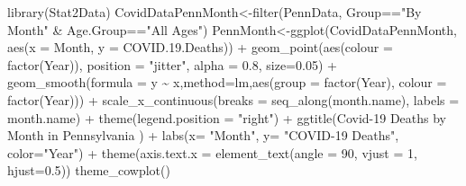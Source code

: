 \documentclass[
]{article}
\newenvironment{Shaded}{\begin{snugshade}}{\end{snugshade}}
\newcommand{\AttributeTok}[1]{\textcolor[rgb]{0.77,0.63,0.00}{#1}}
\newcommand{\DecValTok}[1]{\textcolor[rgb]{0.00,0.00,0.81}{#1}}
\newcommand{\FloatTok}[1]{\textcolor[rgb]{0.00,0.00,0.81}{#1}}
\newcommand{\FunctionTok}[1]{\textcolor[rgb]{0.00,0.00,0.00}{#1}}
\newcommand{\NormalTok}[1]{#1}
\newcommand{\OtherTok}[1]{\textcolor[rgb]{0.56,0.35,0.01}{#1}}
\newcommand{\SpecialCharTok}[1]{\textcolor[rgb]{0.00,0.00,0.00}{#1}}
\newcommand{\StringTok}[1]{\textcolor[rgb]{0.31,0.60,0.02}{#1}}
\begin{document}
\begin{Shaded}
\begin{Highlighting}[]
\FunctionTok{library}\NormalTok{(Stat2Data)}
\NormalTok{CovidDataPennMonth}\OtherTok{\textless{}{-}}\FunctionTok{filter}\NormalTok{(PennData, Group}\SpecialCharTok{==}\StringTok{"By Month"} \SpecialCharTok{\&}\NormalTok{ Age.Group}\SpecialCharTok{==}\StringTok{"All Ages"}\NormalTok{)}
\NormalTok{PennMonth}\OtherTok{\textless{}{-}}\FunctionTok{ggplot}\NormalTok{(CovidDataPennMonth, }\FunctionTok{aes}\NormalTok{(}\AttributeTok{x =}\NormalTok{ Month, }\AttributeTok{y =}\NormalTok{ COVID.}\FloatTok{19.}\NormalTok{Deaths)) }\SpecialCharTok{+}
  \FunctionTok{geom\_point}\NormalTok{(}\FunctionTok{aes}\NormalTok{(}\AttributeTok{colour =} \FunctionTok{factor}\NormalTok{(Year)), }
             \AttributeTok{position =} \StringTok{"jitter"}\NormalTok{, }
             \AttributeTok{alpha =} \FloatTok{0.8}\NormalTok{,}
             \AttributeTok{size=}\FloatTok{0.05}\NormalTok{) }\SpecialCharTok{+}
  \FunctionTok{geom\_smooth}\NormalTok{(}\AttributeTok{formula =}\NormalTok{ y }\SpecialCharTok{\textasciitilde{}}\NormalTok{ x,}\AttributeTok{method=}\StringTok{\textquotesingle{}lm\textquotesingle{}}\NormalTok{,}\FunctionTok{aes}\NormalTok{(}\AttributeTok{group =} \FunctionTok{factor}\NormalTok{(Year), }
                              \AttributeTok{colour =} \FunctionTok{factor}\NormalTok{(Year))) }\SpecialCharTok{+} 
  \FunctionTok{scale\_x\_continuous}\NormalTok{(}\AttributeTok{breaks =} \FunctionTok{seq\_along}\NormalTok{(month.name), }\AttributeTok{labels =}\NormalTok{ month.name) }\SpecialCharTok{+}
  \FunctionTok{theme}\NormalTok{(}\AttributeTok{legend.position =} \StringTok{"right"}\NormalTok{) }\SpecialCharTok{+} 
  \FunctionTok{ggtitle}\NormalTok{(}\StringTok{\textquotesingle{}Covid{-}19 Deaths by Month in Pennsylvania \textquotesingle{}}\NormalTok{) }\SpecialCharTok{+}
  \FunctionTok{labs}\NormalTok{(}\AttributeTok{x=} \StringTok{"Month"}\NormalTok{, }\AttributeTok{y=} \StringTok{"COVID{-}19 Deaths"}\NormalTok{, }\AttributeTok{color=}\StringTok{"Year"}\NormalTok{) }\SpecialCharTok{+}
  \FunctionTok{theme}\NormalTok{(}\AttributeTok{axis.text.x =} \FunctionTok{element\_text}\NormalTok{(}\AttributeTok{angle =} \DecValTok{90}\NormalTok{, }\AttributeTok{vjust =} \DecValTok{1}\NormalTok{, }\AttributeTok{hjust=}\FloatTok{0.5}\NormalTok{))}
  \FunctionTok{theme\_cowplot}\NormalTok{()}
\end{Highlighting}
\end{Shaded}
\end{document}
